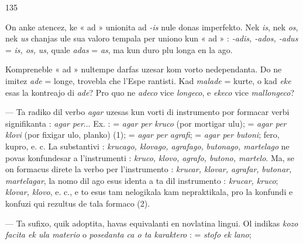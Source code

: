 \begin{VUpage}[139]{135}

On anke atencez, ke « ad » unionita ad \textit{-is} nule donas\nl
imperfekto. Nek \textit{is}, nek \textit{os}, nek \textit{us} chanjas ule sua valoro\nl
tempala per uniono kun « ad » : \textit{-adis, -ados, -adus} = \textit{is, os,}\nl
\textit{us}, quale \textit{adas} = \textit{as}, ma kun duro plu longa en la ago.

Kompreneble « ad » nultempe darfas uzesar kom vorto\nl
nedependanta. Do ne imitez \textit{ade} = longe, trovebla che l'Espe\cc
rantisti. Kad \textit{malade} = kurte, o kad \textit{eke} esas la kontreajo di\nl
\textit{ade}? Pro quo ne \textit{adeco} vice \textit{longeco}, e \textit{ekeco} vice \textit{mallongeco}?\parplein

 --- Ta radiko dil verbo \textit{agar} uzesas kun vorti di\nl
instrumento por formacar verbi signifikanta : \textit{agar per}...\nl
Ex. :  = \textit{agar per kruco} (por mortigar ulu); \nl
= \textit{agar per klovi} (por fixigar ulo, planko) (1);  =\nl
\textit{agar per agrafi};  = \textit{agar per butoni}; \nl
fero, kupro, e. c. La substantivi : \textit{krucago, klovago, agrafago,}\nl
\textit{butonago, martelago} ne povas konfundesar a l'instrumenti :\nl
\textit{kruco, klovo, agrafo, butono, martelo}. Ma, se on formacus\nl
direte la verbo per l'instrumento : \textit{krucar, klovar, agrafar,}\nl
\textit{butonar, martelagar}, la nomo dil ago esus identa a ta dil\nl
instrumento : \textit{krucar, kruco}; \textit{klovar, klovo}, e. c., e to esus\nl
tam nelogikala kam nepraktikala, pro la konfundi e konfuzi\nl
qui rezultus de tala formaco (2).

 --- Ta sufixo, quik adoptita, havas equivalanti en\nl
novlatina lingui. Ol indikas \textit{kozo facita ek ula materio} o\nl
\textit{posedanta ca o ta karaktero} :  = \textit{stofo ek lano}; \parplein
\end{VUpage}

